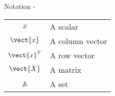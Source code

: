 
\begin{frame}[allowframebreaks,t]{Notation -}

\begin{tabular}{cl}

$x$             & A scalar            \\
$\vect{x}$      & A column vector     \\
$\vect{x}^T$    & A row vector        \\
$\vect{X}$      & A matrix            \\
$\mathbb{A}$    & A set               \\

\end{tabular}

\end{frame}
